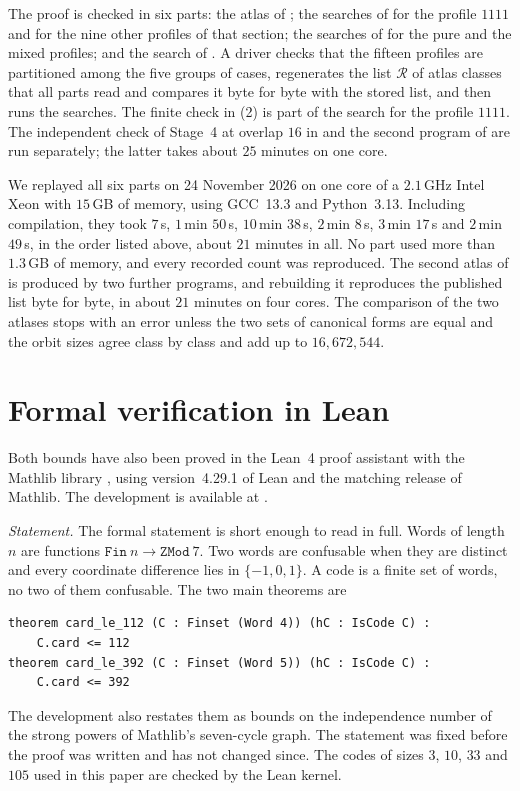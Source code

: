 \documentclass[11pt,colorlinks]{charlie}
\newcommand{\cR}{\mathcal{R}}
\begin{document}
The proof is checked in six parts: the atlas of ; the searches of  for the profile $1111$ and for the nine other profiles of that section; the searches of  for the pure and the mixed profiles; and the search of . A driver checks that the fifteen profiles are partitioned among the five groups of cases, regenerates the list $\cR$ of atlas classes that all parts read and compares it byte for byte with the stored list, and then runs the searches. The finite check in (2) is part of the search for the profile $1111$. The independent check of Stage~4 at overlap $16$ in  and the second program of  are run separately; the latter takes about $25$ minutes on one core.

We replayed all six parts on 24 November 2026 on one core of a $2.1$\,GHz Intel Xeon with $15$\,GB of memory, using GCC~13.3 and Python~3.13. Including compilation, they took $7$\,s, $1$\,min $50$\,s, $10$\,min $38$\,s, $2$\,min $8$\,s, $3$\,min $17$\,s and $2$\,min $49$\,s, in the order listed above, about $21$ minutes in all. No part used more than $1.3$\,GB of memory, and every recorded count was reproduced. The second atlas of  is produced by two further programs, and rebuilding it reproduces the published list byte for byte, in about $21$ minutes on four cores. The comparison of the two atlases stops with an error unless the two sets of canonical forms are equal and the orbit sizes agree class by class and add up to $16{,}672{,}544$.

\section{Formal verification in Lean}\label{sec:lean}
Both bounds have also been proved in the Lean~4 proof assistant \cite{Lean4} with the Mathlib library \cite{Mathlib}, using version~4.29.1 of Lean and the matching release of Mathlib. The development is available at \coderepo.

\emph{Statement.} The formal statement is short enough to read in full. Words of length $n$ are functions $\texttt{Fin}\ n\to\texttt{ZMod}\ 7$. Two words are confusable when they are distinct and every coordinate difference lies in $\{-1,0,1\}$. A code is a finite set of words, no two of them confusable. The two main theorems are
{\footnotesize
\begin{verbatim}
theorem card_le_112 (C : Finset (Word 4)) (hC : IsCode C) :
    C.card <= 112
theorem card_le_392 (C : Finset (Word 5)) (hC : IsCode C) :
    C.card <= 392
\end{verbatim}
}\noindent
The development also restates them as bounds on the independence number of the strong powers of Mathlib's seven-cycle graph. The statement was fixed before the proof was written and has not changed since. The codes of sizes $3$, $10$, $33$ and $105$ used in this paper are checked by the Lean kernel.
\end{document}
